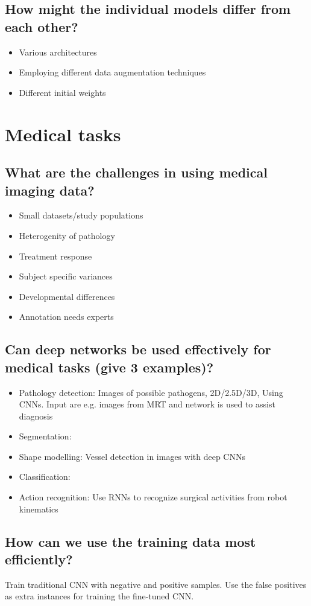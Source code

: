\subsection{How might the individual models differ from each other?}
\begin{itemize}
\item Various architectures
\item Employing different data augmentation techniques
\item Different initial weights
\end{itemize}
%
\section{Medical tasks}
\subsection{What are the challenges in using medical imaging data?}
\begin{multicols}{2}
\begin{itemize}
\item Small datasets/study populations
\item Heterogenity of pathology
\item Treatment response
\item Subject specific variances
\item Developmental differences
\item Annotation needs experts
\end{itemize}
\end{multicols}
\subsection{Can deep networks be used effectively for medical tasks (give 3 examples)?}
\begin{itemize}
\item Pathology detection: Images of possible pathogens, 2D/2.5D/3D, Using CNNs. Input are e.g. images from MRT and network is used to assist diagnosis
\item Segmentation:
\item Shape modelling: Vessel detection in images with deep CNNs
\item Classification: 
\item Action recognition: Use RNNs to recognize surgical activities from robot kinematics
\end{itemize}
\subsection{How can we use the training data most efficiently?}
Train traditional CNN with negative and positive samples. Use the false positives as extra instances for training the fine-tuned CNN.

